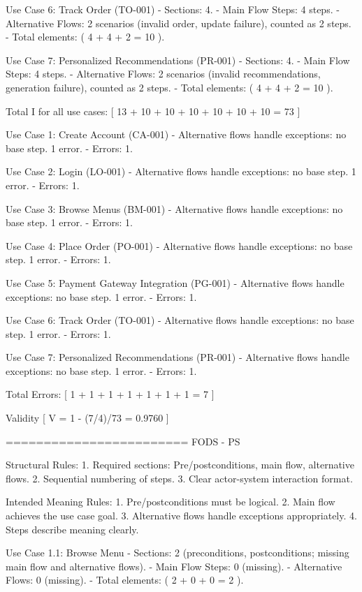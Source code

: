 Use Case 6: Track Order (TO-001)
- Sections: 4.
- Main Flow Steps: 4 steps.
- Alternative Flows: 2 scenarios (invalid order, update failure), counted as 2 steps.
- Total elements: ( 4 + 4 + 2 = 10 ).

Use Case 7: Personalized Recommendations (PR-001)
- Sections: 4.
- Main Flow Steps: 4 steps.
- Alternative Flows: 2 scenarios (invalid recommendations, generation failure), counted as 2 steps.
- Total elements: ( 4 + 4 + 2 = 10 ).

Total I for all use cases:
[
13 + 10 + 10 + 10 + 10 + 10 + 10 = 73
]

Use Case 1: Create Account (CA-001)
- Alternative flows handle exceptions: no base step. 1 error. 
- Errors: 1.

Use Case 2: Login (LO-001)
- Alternative flows handle exceptions: no base step. 1 error.
- Errors: 1.

Use Case 3: Browse Menus (BM-001)
- Alternative flows handle exceptions: no base step. 1 error. 
- Errors: 1.

Use Case 4: Place Order (PO-001)
- Alternative flows handle exceptions: no base step. 1 error. 
- Errors: 1.

Use Case 5: Payment Gateway Integration (PG-001)
- Alternative flows handle exceptions: no base step. 1 error. 
- Errors: 1.

Use Case 6: Track Order (TO-001)
- Alternative flows handle exceptions: no base step. 1 error. 
- Errors: 1.

Use Case 7: Personalized Recommendations (PR-001)
- Alternative flows handle exceptions: no base step. 1 error. 
- Errors: 1.

Total Errors:
[
1 + 1 + 1 + 1 + 1 + 1 + 1 = 7
]

Validity
[
V = 1 - (7/4)/73 = 0.9760
]

========================
FODS - PS

Structural Rules:
1. Required sections: Pre/postconditions, main flow, alternative flows.
2. Sequential numbering of steps.
3. Clear actor-system interaction format.

Intended Meaning Rules:
1. Pre/postconditions must be logical.
2. Main flow achieves the use case goal.
3. Alternative flows handle exceptions appropriately.
4. Steps describe meaning clearly.

Use Case 1.1: Browse Menu
- Sections: 2 (preconditions, postconditions; missing main flow and alternative flows).
- Main Flow Steps: 0 (missing).
- Alternative Flows: 0 (missing).
- Total elements: ( 2 + 0 + 0 = 2 ).

